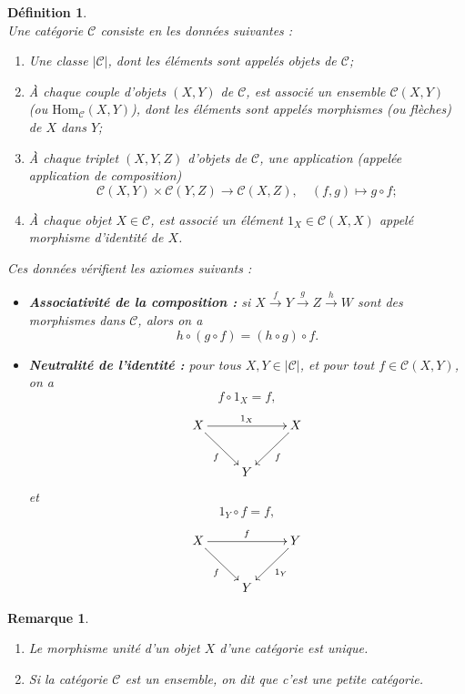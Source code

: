 \documentclass[a4paper, 14pt]{report}
\newtheorem{definition}{Définition}[section]
\newtheorem{remark}{Remarque}[section]
\begin{document}
\begin{onehalfspace}
{\begin{definition} \cite{maclane1971categories} \\
Une catégorie $\mathcal{C}$ consiste en les données suivantes :
	\begin{enumerate} [label=\roman*)]
		\item Une classe $|\mathcal{C}|$, dont les éléments sont appelés objets de $\mathcal{C}$;
		\item À chaque couple d'objets $(X, Y)$ de $\mathcal{C}$, est associé un ensemble $\mathcal{C}(X, Y)$ (ou $\mathrm{Hom}_{\mathcal{C}}(X, Y)$), dont les éléments sont appelés morphismes (ou flèches) de $X$ dans $Y$;
		\item À chaque triplet $(X, Y, Z)$ d'objets de $\mathcal{C}$, une application (appelée application de composition)
		\[
		\mathcal{C}(X, Y) \times \mathcal{C}(Y, Z) \to \mathcal{C}(X, Z), \quad (f, g) \mapsto g \circ f;
		\]
		\item À chaque objet $X \in \mathcal{C}$, est associé un élément $1_X \in \mathcal{C}(X, X)$ appelé morphisme d'identité de $X$.
	\end{enumerate}
Ces données vérifient les axiomes suivants :
	\begin{itemize}
		\item \textbf{Associativité de la composition :}
		si $X \xrightarrow{f} Y \xrightarrow{g} Z \xrightarrow{h} W$ sont des morphismes dans $\mathcal{C}$, alors on a
		\[
		h \circ (g \circ f) = (h \circ g) \circ f.
		\]
		\item \textbf{Neutralité de l'identité :}
		pour tous $X, Y \in |\mathcal{C}|$, et pour tout $f \in \mathcal{C}(X, Y)$, on a
		\[
		f \circ 1_{X} = f,
		\]
		\[
		\xymatrix{
			X \ar[rr]^{1_{X}} \ar[dr]_{f} & & X \ar[dl]^{f} \\
			& Y &
		}
		\]
		et
		\[
		1_{Y} \circ f = f,
		\]
		\[
		\xymatrix{
			X \ar[rr]^{f} \ar[dr]_{f} & & Y \ar[dl]^{1_{Y}} \\
			& Y &
		}
		\]
	\end{itemize}
\end{definition}

\begin{remark} \cite{maclane1971categories} 
	\begin{enumerate} 
		\item Le morphisme unité d'un objet $X$ d'une catégorie est unique.
		\item Si la  catégorie $\mathcal{C}$ est un ensemble, on dit que c'est une petite catégorie.
	\end{enumerate}
\end{remark}

}
\end{onehalfspace}
\end{document}
